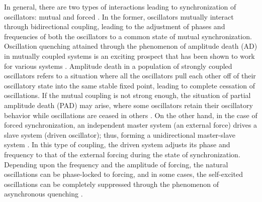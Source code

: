 \documentclass[%
preprint,
 amsmath,amssymb,
 aps,
 pra,
]{revtex4-2}
\begin{document}
In general, there are two types of interactions leading to synchronization of oscillators: mutual and forced \cite{pikovsky2003synchronization}. In the former, oscillators mutually interact through bidirectional coupling, leading to the adjustment of phases and frequencies of both the oscillators to a common state of mutual synchronization. Oscillation quenching attained through the phenomenon of amplitude death (AD) in mutually coupled systems is an exciting prospect that has been shown to work for various systems \cite{pyragas2000stabilization, kumar2011role, huddy2012amplitude, mirollo1990amplitude}. Amplitude death in a population of strongly coupled oscillators refers to a situation where all the oscillators pull each other off of their oscillatory state into the same stable fixed point, leading to complete cessation of oscillations. If the mutual coupling is not strong enough, the situation of partial amplitude death (PAD) may arise, where some oscillators retain their oscillatory behavior while oscillations are ceased in others \cite{atay2003total}. On the other hand, in the case of forced synchronization, an independent master system (an external force) drives a slave system (driven oscillator); thus, forming a unidirectional master-slave system \cite{balanov2008synchronization}. In this type of coupling, the driven system adjusts its phase and frequency to that of the external forcing during the state of synchronization. Depending upon the frequency and the amplitude of forcing, the natural oscillations can be phase-locked to forcing, and in some cases, the self-excited oscillations can be completely suppressed through the phenomenon of asynchronous quenching  \cite{keen1970suppression, mondal2019forced}.
\end{document}
